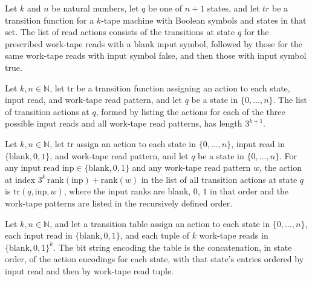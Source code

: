 \begin{definition}
\label{Turing.StepBlock.readActions}
\leanok
{}
Let $k$ and $n$ be natural numbers, let $q$ be one of $n+1$ states, and let $tr$ be a
transition function for a $k$-tape machine with Boolean symbols and states in that set.
The list of read actions consists of the transitions at state $q$ for the prescribed
work-tape reads with a blank input symbol, followed by those for the same work-tape
reads with input symbol false, and then those with input symbol true.
\end{definition}

\begin{lemma}
\label{Turing.StepBlock.readActions_length}
\leanok
{}
Let $k,n\in\mathbb{N}$, let $\mathrm{tr}$ be a transition function assigning an action
to each state, input read, and work-tape read pattern, and let $q$ be a state in
$\{0,\ldots,n\}$. The list of transition actions at $q$, formed by listing the actions
for each of the three possible input reads and all work-tape read patterns, has length
$3^{k+1}$.
\end{lemma}

\begin{lemma}
\label{Turing.StepBlock.readActions_at}
\leanok
{}
Let $k,n\in\mathbb{N}$, let $\mathrm{tr}$ assign an action to each state in
$\{0,\ldots,n\}$, input read in $\{\text{blank},0,1\}$, and work-tape read pattern, and
let $q$ be a state in $\{0,\ldots,n\}$. For any input read
$\mathrm{inp}\in\{\text{blank},0,1\}$ and any work-tape read pattern $w$, the action at
index $3^k\,\mathrm{rank}(\mathrm{inp})+\mathrm{rank}(w)$ in the list of all transition
actions at state $q$ is $\mathrm{tr}(q,\mathrm{inp},w)$, where the input ranks are
blank, $0$, $1$ in that order and the work-tape patterns are listed in the recursively
defined order.
\end{lemma}

\begin{lemma}
\label{Turing.StepBlock.tableBitsK_groups}
\leanok
{}
Let $k,n\in\mathbb{N}$, and let a transition table assign an action to each state in
$\{0,\ldots,n\}$, each input read in $\{\text{blank},0,1\}$, and each tuple of $k$
work-tape reads in $\{\text{blank},0,1\}^k$. The bit string encoding the table is the
concatenation, in state order, of the action encodings for each state, with that state's
entries ordered by input read and then by work-tape read tuple.
\end{lemma}

